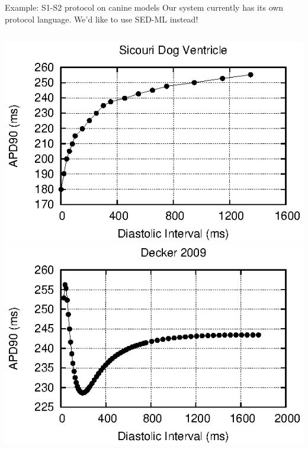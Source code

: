 \documentclass[t,xcolor={usenames,dvipsnames}]{beamer}
\begin{document}
\begin{frame}{Example: S1-S2 protocol on canine models}
Our system currently has its own protocol language.
We'd like to use SED-ML instead!
\vspace{-.6cm}
\begin{columns}[T]
\begin{column}{.33\linewidth}
\begin{center}
\includegraphics[width=\textwidth]{sicouri_dog_ventricle_s1s2_curve}\\
\vspace{.1cm}
\includegraphics[width=\textwidth]{decker_2009_s1s2_curve}
\end{center}
\end{column}

\end{columns}
\end{frame}
\end{document}
